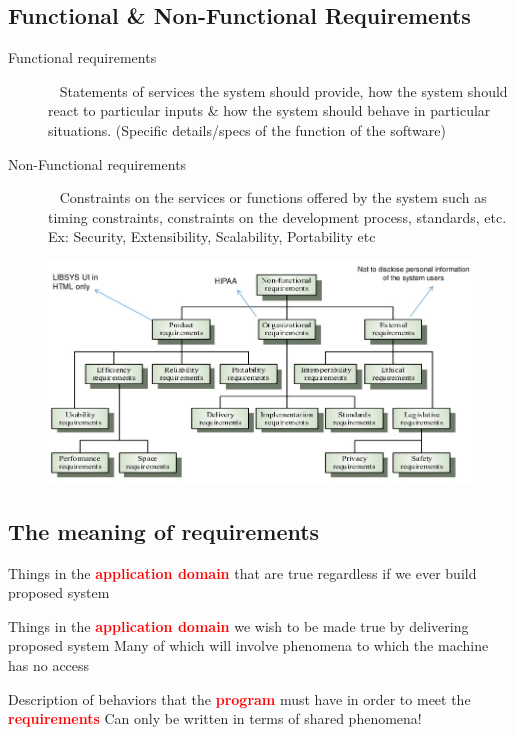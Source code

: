 \documentclass{report}
\newcommand{\textr}[1]{\textcolor{red}{#1}}
\newcommand{\textbfr}[1]{\textbf{\textr{#1}}}
\begin{document}
\subsection{Functional \& Non-Functional Requirements}
\begin{description}
  \item [Functional requirements] \ \newline
   Statements of services the system should provide, how the system should react to particular inputs \& how the system should behave in particular situations. (Specific details/specs of the function of the software)
  \item [Non-Functional requirements] \ \newline
   Constraints on the services or functions offered by the system such as timing constraints, constraints on the development process, standards, etc. Ex: Security, Extensibility, Scalability, Portability etc
\end{description}
\begin{figure}[H]
\centering
\includegraphics[scale=.45,trim=1cm 1cm 1cm 1cm]{assets/CEN4010_Non-Function_Requirements.jpg}
\end{figure}


\subsection{The meaning of requirements}
\begin{description}[style=multiline,leftmargin=9.5em]
  \item [Domain Properties] Things in the \textbfr{application domain} that are true regardless if we ever build  proposed system
  \item [Requirements] Things in the \textbfr{application domain} we wish to be made true by delivering proposed system\newline
Many of which will involve phenomena to which the machine has no
access
  \item [A Specification] Description of behaviors that the \textbfr{program} must have in order to meet the \textbfr{requirements}\newline 
Can only be written in terms of shared phenomena!
\end{description}
\end{document}
